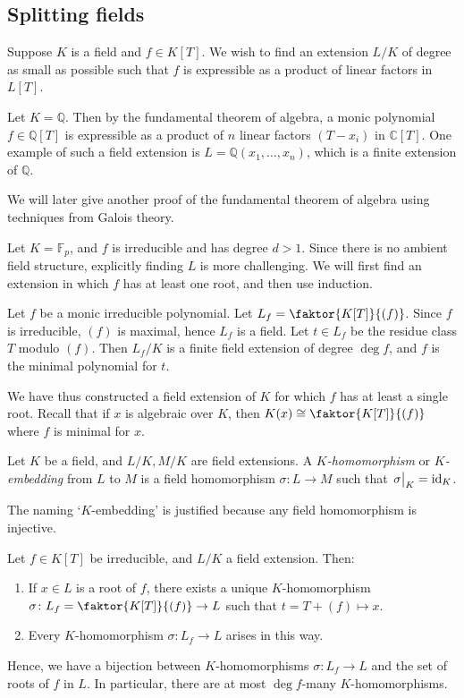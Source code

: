 \subsection{Splitting fields}
Suppose \( K \) is a field and \( f \in K[T] \).
We wish to find an extension \( L / K \) of degree as small as possible such that \( f \) is expressible as a product of linear factors in \( L[T] \).
\begin{example}
	Let \( K = \mathbb Q \).
	Then by the fundamental theorem of algebra, a monic polynomial \( f \in \mathbb Q[T] \) is expressible as a product of \( n \) linear factors \( (T - x_i) \) in \( \mathbb C[T] \).
	One example of such a field extension is \( L = \mathbb Q(x_1, \dots, x_n) \), which is a finite extension of \( \mathbb Q \).
\end{example}
We will later give another proof of the fundamental theorem of algebra using techniques from Galois theory.
\begin{example}
	Let \( K = \mathbb F_p \), and \( f \) is irreducible and has degree \( d > 1 \).
	Since there is no ambient field structure, explicitly finding \( L \) is more challenging.
	We will first find an extension in which \( f \) has at least one root, and then use induction.
\end{example}
\begin{theorem}
	Let \( f \) be a monic irreducible polynomial.
	Let \( L_f = \faktor{K[T]}{(f)} \).
	Since \( f \) is irreducible, \( (f) \) is maximal, hence \( L_f \) is a field.
	Let \( t \in L_f \) be the residue class \( T \) modulo \( (f) \).
	Then \( L_f/K \) is a finite field extension of degree \( \deg f \), and \( f \) is the minimal polynomial for \( t \).
\end{theorem}
We have thus constructed a field extension of \( K \) for which \( f \) has at least a single root.
Recall that if \( x \) is algebraic over \( K \), then \( K(x) \cong \faktor{K[T]}{(f)} \) where \( f \) is minimal for \( x \).
\begin{definition}
	Let \( K \) be a field, and \( L / K, M / K \) are field extensions.
	A \emph{\( K \)-homomorphism} or \emph{\( K \)-embedding} from \( L \) to \( M \) is a field homomorphism \( \sigma \colon L \to M \) such that \( \eval{\sigma}_K = \mathrm{id}_K \).
\end{definition}
The naming `\( K \)-embedding' is justified because any field homomorphism is injective.
\begin{theorem}
	Let \( f \in K[T] \) be irreducible, and \( L / K \) a field extension.
	Then:
	\begin{enumerate}
		\item If \( x \in L \) is a root of \( f \), there exists a unique \( K \)-homomorphism \( \sigma \colon L_f = \faktor{K[T]}{(f)} \to L \) such that \( t = T + (f) \mapsto x \).
		\item Every \( K \)-homomorphism \( \sigma \colon L_f \to L \) arises in this way.
	\end{enumerate}
	Hence, we have a bijection between \( K \)-homomorphisms \( \sigma \colon L_f \to L \) and the set of roots of \( f \) in \( L \).
	In particular, there are at most \( \deg f \)-many \( K \)-homomorphisms.
\end{theorem}
